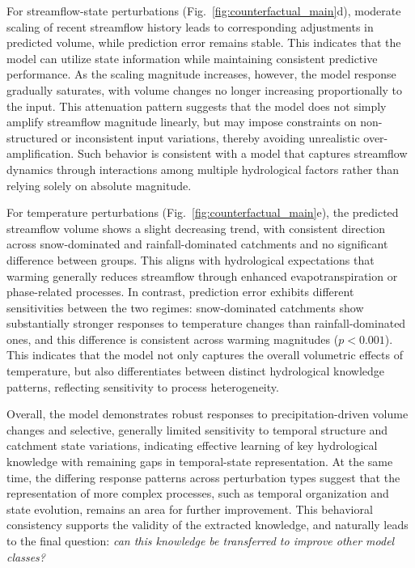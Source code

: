 For streamflow-state perturbations (Fig.~\ref{fig:counterfactual_main}d), moderate scaling of recent streamflow history leads to corresponding adjustments in predicted volume, while prediction error remains stable. This indicates that the model can utilize state information while maintaining consistent predictive performance. As the scaling magnitude increases, however, the model response gradually saturates, with volume changes no longer increasing proportionally to the input. This attenuation pattern suggests that the model does not simply amplify streamflow magnitude linearly, but may impose constraints on non-structured or inconsistent input variations, thereby avoiding unrealistic over-amplification. Such behavior is consistent with a model that captures streamflow dynamics through interactions among multiple hydrological factors\cite{bloschl2017changing} rather than relying solely on absolute magnitude.

For temperature perturbations (Fig.~\ref{fig:counterfactual_main}e), the predicted streamflow volume shows a slight decreasing trend, with consistent direction across snow-dominated and rainfall-dominated catchments and no significant difference between groups. This aligns with hydrological expectations that warming generally reduces streamflow through enhanced evapotranspiration or phase-related processes. In contrast, prediction error exhibits different sensitivities between the two regimes: snow-dominated catchments show substantially stronger responses to temperature changes than rainfall-dominated ones\cite{milly2020colorado}, and this difference is consistent across warming magnitudes ($p < 0.001$). This indicates that the model not only captures the overall volumetric effects of temperature, but also differentiates between distinct hydrological knowledge patterns, reflecting sensitivity to process heterogeneity.

\FloatBarrier

Overall, the model demonstrates robust responses to precipitation-driven volume changes and selective, generally limited sensitivity to temporal structure and catchment state variations\cite{LouiseSlater2024_XAI_Hydrology}, indicating effective learning of key hydrological knowledge with remaining gaps in temporal-state representation. At the same time, the differing response patterns across perturbation types suggest that the representation of more complex processes, such as temporal organization and state evolution, remains an area for further improvement. This behavioral consistency supports the validity of the extracted knowledge, and naturally leads to the final question: \textit{can this knowledge be transferred to improve other model classes?}

